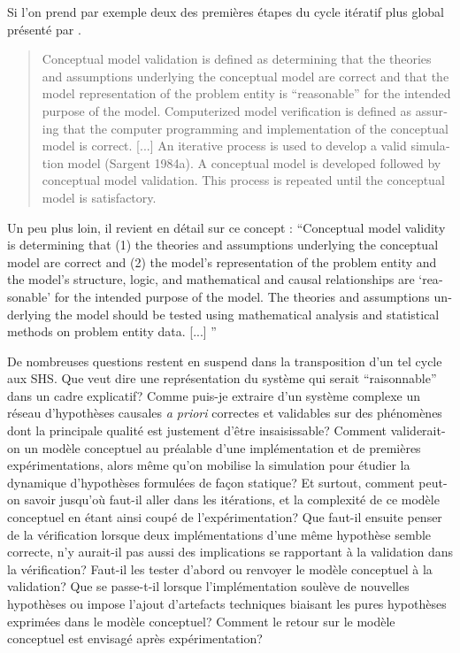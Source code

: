Si l'on prend par exemple deux des premières étapes du cycle itératif plus global présenté par \textcite{Sargent2010}.

\foreignblockquote{english}[\cite{Sargent2010}]{Conceptual model validation is defined as determining that the theories and assumptions underlying the conceptual model are correct and that the model representation of the problem entity is \enquote{reasonable}  for the intended purpose of the model. Computerized model verification is defined as assuring that the computer programming and implementation of the conceptual model is correct. [...] An iterative process is used to develop a valid simulation model (Sargent 1984a). A conceptual model is developed followed by conceptual model validation. This process is repeated until the conceptual model is satisfactory.} Un peu plus loin, il revient en détail sur ce concept : \foreignquote{english}{Conceptual model validity is determining that (1) the theories and assumptions underlying the conceptual model are correct and (2) the model’s representation of the problem entity and the model’s structure, logic, and mathematical and causal relationships are \enquote{reasonable} for the intended purpose of the model. The theories and assumptions underlying the model should be tested using mathematical analysis and statistical methods on problem entity data. [...] }

De nombreuses questions restent en suspend dans la transposition d'un tel cycle aux SHS. Que veut dire une représentation du système qui serait \enquote{raisonnable} dans un cadre explicatif? Comme puis-je extraire d'un système complexe un réseau d'hypothèses causales \textit{a priori} correctes et validables sur des phénomènes dont la principale qualité est justement d'être insaisissable? Comment validerait-on un modèle conceptuel au préalable d'une implémentation et de premières expérimentations, alors même qu'on mobilise la simulation pour étudier la dynamique d'hypothèses formulées de façon statique? Et surtout, comment peut-on savoir jusqu'où faut-il aller dans les itérations, et la complexité de ce modèle conceptuel en étant ainsi coupé de l'expérimentation? Que faut-il ensuite penser de la vérification lorsque deux implémentations d'une même hypothèse semble correcte, n'y aurait-il pas aussi des implications se rapportant à la validation dans la vérification? Faut-il les tester d'abord ou renvoyer le modèle conceptuel à la validation? Que se passe-t-il lorsque l'implémentation soulève de nouvelles hypothèses ou impose l'ajout d'artefacts techniques biaisant les pures hypothèses exprimées dans le modèle conceptuel? Comment le retour sur le modèle conceptuel est envisagé après expérimentation?

